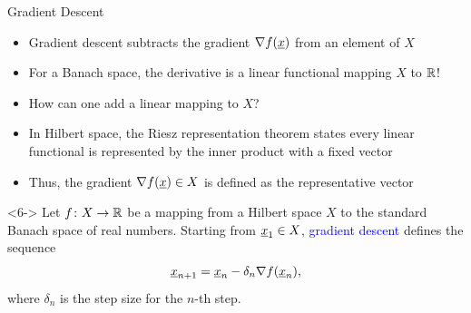 \documentclass[10pt,english,aspectratio=169]{beamer}
\begin{document}
\begin{frame}{Gradient Descent}

\begin{itemize}
\setlength\itemsep{1.5mm}
\item<1-> Gradient descent subtracts the gradient $\nabla f(\underline{x})$ from an element of $X\!\!\!$

\item<2-> For a Banach space, the derivative is a linear functional mapping $X$ to $\mathbb{R}$!

\item<3-> How can one add a linear mapping to $X$?

\item<4-> In Hilbert space, the Riesz representation theorem states every linear functional is represented by the inner product with a fixed vector

\item<5-> Thus, the gradient $\nabla f (\underline{x}) \in X$ is defined as the representative vector
\end{itemize}

\begin{definition}<6->
Let $f \colon X \rightarrow \mathbb{R}$ be a mapping from a Hilbert space $X$ to the standard Banach space of real numbers.
Starting from $\underline{x}_1 \in X$, \textcolor{blue}{gradient descent} defines the sequence \vspace{-1mm}
\[ \underline{x}_{n+1} = \underline{x}_n - \delta_n \nabla f(\underline{x}_n), \]
where $\delta_n$ is the step size for the $n$-th step.
\end{definition}

\end{frame}
\end{document}

